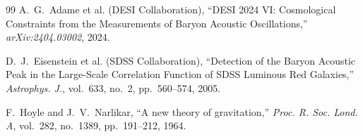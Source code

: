 \documentclass[11pt,a4paper]{article}
\begin{document}
\begin{thebibliography}{99}
    A.~G.~Adame et al. (DESI Collaboration), ``DESI 2024 VI: Cosmological Constraints from the Measurements of Baryon Acoustic Oscillations,'' \textit{arXiv:2404.03002}, 2024.

    D.~J.~Eisenstein et al. (SDSS Collaboration), ``Detection of the Baryon Acoustic Peak in the Large-Scale Correlation Function of SDSS Luminous Red Galaxies,'' \textit{Astrophys. J.}, vol.~633, no.~2, pp.~560--574, 2005.

    F.~Hoyle and J.~V.~Narlikar, ``A new theory of gravitation,'' \textit{Proc. R. Soc. Lond. A}, vol.~282, no.~1389, pp.~191--212, 1964.
\end{thebibliography}
\end{document}
